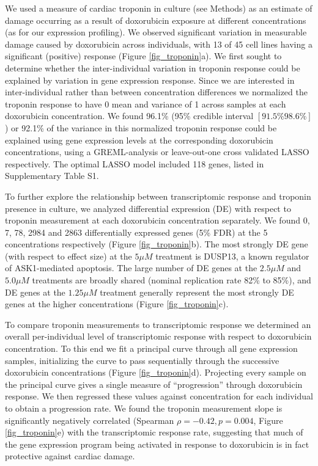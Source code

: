 \documentclass{article}
\begin{document}
We used a measure of cardiac troponin in culture (see Methods) as an estimate of damage occurring as a result of doxorubicin exposure at different concentrations (as for our expression profiling). We observed significant variation in measurable damage caused by doxorubicin across individuals, with 13 of 45 cell lines having a significant (positive) response (Figure \ref{fig_troponin}a). We first sought to determine whether the inter-individual variation in troponin response could be explained by variation in gene expression response. Since we are interested in inter-individual rather than between concentration differences we normalized the troponin response to have 0 mean and variance of 1 across samples at each doxorubicin concentration. We found 96.1\% (95\% credible interval $[91.5\% 98.6\%]$) or 92.1\% of the variance in this normalized troponin response could be explained using gene expression levels at the corresponding doxorubicin concentrations, using a GREML-analysis\cite{Yang2010-cx} or leave-out-one cross validated LASSO\cite{tibshirani1996regression} respectively. The optimal LASSO model included 118 genes, listed in Supplementary Table S1. \cite{todoWithWithoutTrop}

To further explore the relationship between transcriptomic response and troponin presence in culture, we analyzed differential expression (DE) with respect to troponin measurement at each doxorubicin concentration separately. We found 0, 7, 78, 2984 and 2863 differentially expressed genes (5\% FDR) at the 5 concentrations respectively (Figure \ref{fig_troponin}b). The most strongly DE gene (with respect to effect size) at the $5 \mu M$ treatment is DUSP13, a known regulator of ASK1-mediated apoptosis\cite{park2010positive}. The large number of DE genes at the $2.5 \mu M$ and $5.0 \mu M$ treatments are broadly shared (nominal replication rate 82\% to 85\%), and DE genes at the $1.25 \mu M$ treatment generally represent the most strongly DE genes at the higher concentrations (Figure \ref{fig_troponin}c). 

To compare troponin measurements to transcriptomic response we determined an overall per-individual level of transcriptomic response with respect to doxorubicin concentration. To this end we fit a principal curve\citep{hastie1989principal} through all gene expression samples, initializing the curve to pass sequentially through the successive doxorubicin concentrations (Figure \ref{fig_troponin}d). Projecting every sample on the principal curve gives a single measure of ``progression'' through doxorubicin response. We then regressed these values against concentration for each individual to obtain a progression rate. We found the troponin measurement slope is significantly negatively correlated (Spearman $\rho=-0.42, p=0.004$, Figure \ref{fig_troponin}e) with the transcriptomic response rate, suggesting that much of the gene expression program being activated in response to doxorubicin is in fact protective against cardiac damage. 
\end{document}
